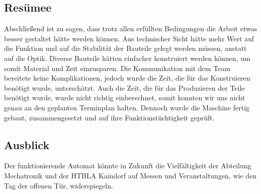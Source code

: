 \subsection{Resümee}
Abschließend ist zu sagen, dass trotz allen erfüllten Bedingungen die Arbeit etwas besser gestaltet hätte werden können.
Aus technischer Sicht hätte mehr Wert auf die Funktion und auf die Stabilität der Bauteile gelegt werden müssen, anstatt
auf die Optik.
Diverse Bauteile hätten einfacher konstruiert werden können, um somit Material und Zeit einzusparen.
Die Kommunikation mit dem Team bereitete keine Komplikationen, jedoch wurde die Zeit, die für das Konstruieren benötigt wurde, unterschätzt.
Auch die Zeit, die für das Produzieren der Teile benötigt wurde, wurde nicht richtig einberechnet, somit
konnten wir uns nicht genau an den geplanten Terminplan halten.
Dennoch wurde die Maschine fertig gebaut, zusammengesetzt
und auf ihre Funktionstüchtigkeit geprüft.

\subsection{Ausblick}
Der funktionierende Automat könnte in Zukunft die Vielfältigkeit der Abteilung Mechatronik und der HTBLA Kaindorf auf
Messen und Veranstaltungen, wie den Tag der offenen Tür, widerspiegeln.